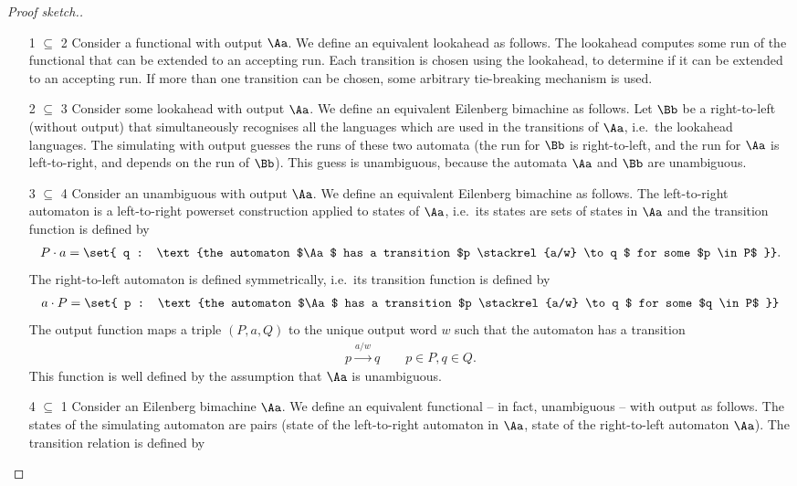 \begin{proof}[Proof sketch.]\ 
\begin{itemize}
	\item[1 $\subseteq$ 2] Consider a functional \nfa with output $\Aa$. We define an equivalent  lookahead \dfa as follows. The lookahead \dfa computes some run of the functional \nfa that can be extended to an accepting run. Each transition is chosen using the lookahead, to determine if it can be extended to an accepting run.  If more than one transition can be chosen, some arbitrary tie-breaking mechanism is used.
\item[2 $\subseteq$ 3] Consider some  lookahead \dfa with output $\Aa$. We define an equivalent Eilenberg bimachine as follows.  Let $\Bb$ be a   right-to-left \dfa (without output) that simultaneously recognises all the languages which are used in the transitions of $\Aa$, i.e.~the lookahead languages. The simulating \nfa with output guesses the runs of these two automata (the run for $\Bb$ is right-to-left, and the run for $\Aa$ is left-to-right, and depends on the run of $\Bb$). This guess is unambiguous, because the automata $\Aa$ and $\Bb$ are unambiguous.
\item[3 $\subseteq$ 4] Consider an unambiguous \nfa with output $\Aa$. We define an equivalent  Eilenberg bimachine as follows.  The left-to-right automaton is a left-to-right powerset construction applied to states of $\Aa$, i.e.~its states are sets of states in $\Aa$ and the transition function is defined by
\begin{align*}
P \cdot a  = \set{ q : \text{the automaton $\Aa$ has a transition $p \stackrel {a/w} \to q
$ for some $p \in P$ }}	.
\end{align*}
The right-to-left automaton is defined symmetrically, i.e.~its transition function is defined by
\begin{align*}
a \cdot P   = \set{ p : \text{the automaton $\Aa$ has a transition $p \stackrel {a/w} \to q
$ for some $q  \in P$ }}	
\end{align*}
The output function maps a triple $(P,a,Q)$ to the unique output  word $w$ such that the automaton has a transition
\begin{align*}
p \stackrel {a/w} \to q \qquad p \in P, q \in Q.
\end{align*}
This function is well defined by the assumption that $\Aa$ is unambiguous.
\item[4 $\subseteq$ 1] Consider an Eilenberg bimachine $\Aa$. We define an equivalent functional  -- in fact, unambiguous -- \nfa with output as follows. The states of the simulating automaton are pairs (state of the left-to-right automaton in $\Aa$, state of the right-to-left automaton $\Aa$). The transition relation is defined by

\end{itemize}
\end{proof}
